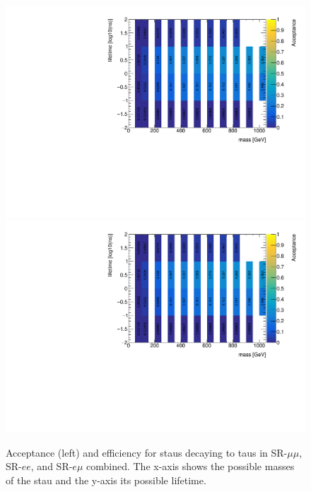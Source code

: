 \begin{figure}[htbp]
\centering
\includegraphics[width=.48\textwidth]{figures/event_selection/mm_slep_acc.pdf}
\includegraphics[width=.48\textwidth]{figures/event_selection/mm_slep_acc.pdf}
\caption{Acceptance (left) and efficiency for staus decaying to taus in SR-$\mu\mu$, SR-$ee$, and SR-$e\mu$ combined. The x-axis shows the possible masses of the stau and the y-axis its possible lifetime.}
\label{fig:acc-eff-em}
\end{figure}




